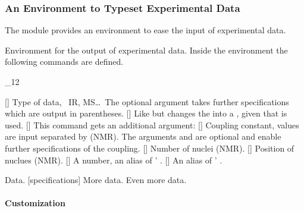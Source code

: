 \documentclass[load-preamble+]{cnltx-doc}
\makeatletter
\def\chemmodule*#1{\textquotedblleft#1\textquotedblright}%
\renewenvironment{commands}
  {%
    \cnltx@set@catcode_{12}%
    \let\command\cnltx@command
    \cnltxlist
  }
  {\endcnltxlist}
\makeatother
\begin{document}
\subsubsection{An Environment to Typeset Experimental Data}

The  module provides an environment to ease the input
of experimental data.
\begin{environments}
    Environment for the output of experimental data.  Inside the environment
    the following commands are defined.
\end{environments}
\begin{commands}
  \command{data}[]
    Type of data, \eg\ IR, MS\ldots\  The optional argument takes further
    specifications which are output in parentheses.
  \command{data}[\sarg{}]
    Like  but changes the \code{=} into a \code{:}, given that
     is used.
  \command{NMR}[]
    This command gets an additional argument:
     
  \command{J}[]
    Coupling constant, values are input separated by \code{;} (NMR).  The
    arguments  and  are optional
    and enable further specifications of the coupling.
  \command{\#}[]
    Number of nuclei (NMR).
  \command{pos}[]
    Position of nuclues (NMR).
  \command{val}[]
    A number, an alias of ' .
  \command{val}[]
    An alias of ' .
\end{commands}

\begin{example}
  \begin{experimental}
     Data.
    [specifications] More data.
     Even more data.
  \end{experimental}
\end{example}

\paragraph{Customization}\label{sec:experimental-customization}
\end{document}
